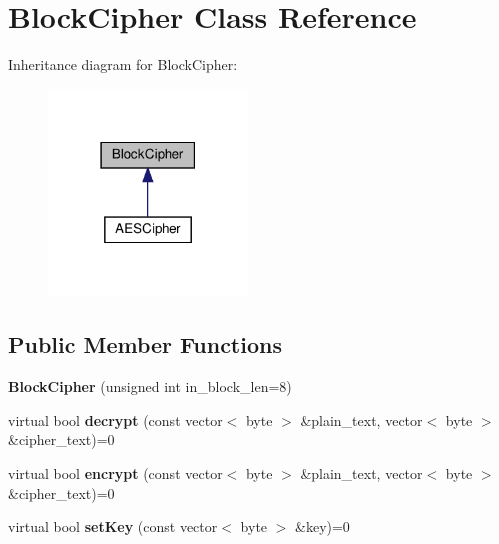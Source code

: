 \hypertarget{classBlockCipher}{}\section{Block\+Cipher Class Reference}
\label{classBlockCipher}


Inheritance diagram for Block\+Cipher\+:
\nopagebreak
\begin{figure}[H]
\begin{center}
\leavevmode
\includegraphics[width=150pt]{classBlockCipher__inherit__graph}
\end{center}
\end{figure}
\subsection*{Public Member Functions}
\begin{DoxyCompactItemize}
\item 
\mbox{\label{classBlockCipher_a3c95996f1004e8bbf2b681168d1bd0a9}} 
{\bfseries Block\+Cipher} (unsigned int in\+\_\+block\+\_\+len=8)
\item 
\mbox{\label{classBlockCipher_aa6feefe4bf7b8844c44e06240439715a}} 
virtual bool {\bfseries decrypt} (const vector$<$ byte $>$ \&plain\+\_\+text, vector$<$ byte $>$ \&cipher\+\_\+text)=0
\item 
\mbox{\label{classBlockCipher_a6b9e82d14004c855a47d79e9de8b3450}} 
virtual bool {\bfseries encrypt} (const vector$<$ byte $>$ \&plain\+\_\+text, vector$<$ byte $>$ \&cipher\+\_\+text)=0
\item 
\mbox{\label{classBlockCipher_a2d97a0cb8efa9109eefea09c7019f064}} 
virtual bool {\bfseries set\+Key} (const vector$<$ byte $>$ \&key)=0
\end{DoxyCompactItemize}
